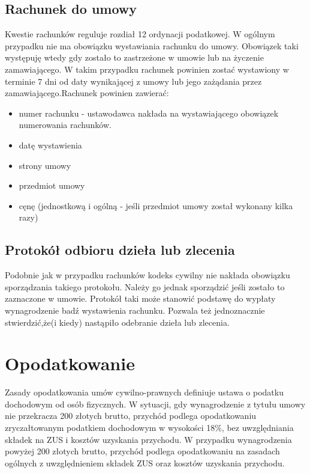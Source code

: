 \subsection[Rachunek do umowy][Rachunek do umowy]{Rachunek do umowy}
Kwestie rachunków reguluje rozdiał 12 ordynacji podatkowej\cite{TODO}. W ogólnym przypadku nie ma obowiązku wystawiania rachunku do umowy. Obowiązek taki występuję wtedy gdy zostało to zastrzeżone w umowie lub na życzenie zamawiającego. W takim przypadku rachunek powinien zostać wystawiony w terminie 7 dni od daty wynikającej z umowy lub jego zażądania przez zamawiającego.Rachunek powinien zawierać:
\begin{itemize}
\item numer rachunku - ustawodawca nakłada na wystawiającego obowiązek numerowania rachunków.
\item datę wystawienia
\item strony umowy
\item przedmiot umowy
\item cęnę (jednostkową i ogólną - jeśli przedmiot umowy został wykonany kilka razy)
\end{itemize}

\subsection[Protokół odbioru dzieła lub zlecenia][Protokół odbioru dzieła lub zlecenia]{Protokół odbioru dzieła lub zlecenia}
Podobnie jak w przypadku rachunków kodeks cywilny nie nakłada obowiązku sporządzania takiego protokołu. Należy go jednak sporządzić jeśli zostało to zaznaczone w umowie. Protokół taki może stanowić podstawę do wypłaty wynagrodzenie badź wystawienia rachunku. Pozwala też jednoznacznie stwierdzić,że(i kiedy) nastąpiło odebranie dzieła lub zlecenia.

\section[Opodatkowanie][Opodatkowanie]{Opodatkowanie}
Zasady opodatkowania umów cywilno-prawnych definiuje ustawa o podatku dochodowym od osób fizycznych\cite{TODO}. W sytuacji, gdy wynagrodzenie z tytułu umowy nie przekracza 200 złotych brutto, przychód podlega opodatkowaniu zryczałtowanym podatkiem dochodowym w wysokości 18\%, bez uwzględniania składek na ZUS i kosztów uzyskania przychodu.
W przypadku wynagrodzenia powyżej 200 złotych brutto, przychód podlega opodatkowaniu na zasadach ogólnych z uwzględnieniem składek ZUS oraz kosztów uzyskania przychodu.

